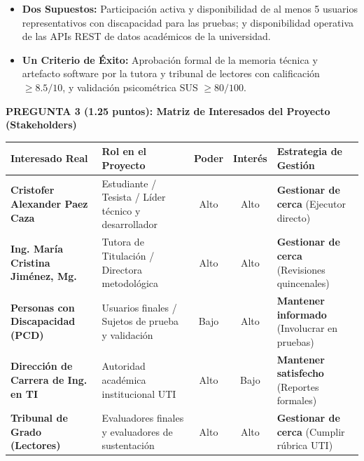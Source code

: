 \documentclass[10pt,a4paper]{article}
\begin{document}
\begin{itemize}
    \item \textbf{Dos Supuestos:} Participación activa y disponibilidad de al menos 5 usuarios representativos con discapacidad para las pruebas; y disponibilidad operativa de las APIs REST de datos académicos de la universidad.
    \item \textbf{Un Criterio de Éxito:} Aprobación formal de la memoria técnica y artefacto software por la tutora y tribunal de lectores con calificación $\ge 8.5/10$, y validación psicométrica SUS $\ge 80/100$.
\end{itemize}

\newpage

\begin{tcolorbox}[colback=utiLightBlue, colframe=utiBlue, arc=3pt, left=6pt, right=6pt, top=4pt, bottom=4pt]
\textbf{\color{utiNavy}PREGUNTA 3 (1.25 puntos): Matriz de Interesados del Proyecto (Stakeholders)}
\end{tcolorbox}

\begin{center}
\footnotesize
\renewcommand{\arraystretch}{1.15}
\begin{tabularx}{\textwidth}{X X c c X}
\toprule
\textbf{Interesado Real} & \textbf{Rol en el Proyecto} & \textbf{Poder} & \textbf{Interés} & \textbf{Estrategia de Gestión} \\
\midrule
\textbf{Cristofer Alexander Paez Caza} & Estudiante / Tesista / Líder técnico y desarrollador & Alto & Alto & \textbf{Gestionar de cerca} (Ejecutor directo) \\
\textbf{Ing. María Cristina Jiménez, Mg.} & Tutora de Titulación / Directora metodológica & Alto & Alto & \textbf{Gestionar de cerca} (Revisiones quincenales) \\
\textbf{Personas con Discapacidad (PCD)} & Usuarios finales / Sujetos de prueba y validación & Bajo & Alto & \textbf{Mantener informado} (Involucrar en pruebas) \\
\textbf{Dirección de Carrera de Ing. en TI} & Autoridad académica institucional UTI & Alto & Bajo & \textbf{Mantener satisfecho} (Reportes formales) \\
\textbf{Tribunal de Grado (Lectores)} & Evaluadores finales y evaluadores de sustentación & Alto & Alto & \textbf{Gestionar de cerca} (Cumplir rúbrica UTI) \\
\bottomrule
\end{tabularx}
\end{center}
\end{document}
